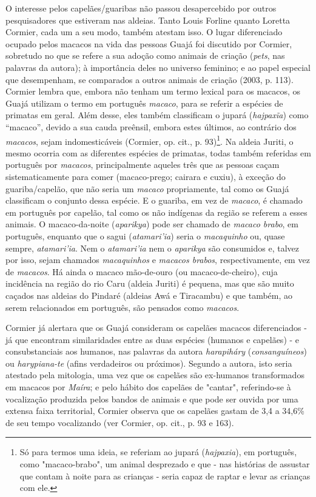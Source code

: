 O interesse pelos capelães/guaribas não passou desapercebido por outros
pesquisadores que estiveram nas aldeias. Tanto Louis Forline quanto
Loretta Cormier, cada um a seu modo, também atestam isso. O lugar
diferenciado ocupado pelos macacos na vida das pessoas Guajá foi
discutido por Cormier, sobretudo no que se refere a sua adoção como
animais de criação (\emph{pets}, nas palavras da autora); à importância
deles no universo feminino; e ao papel especial que desempenham, se
comparados a outros animais de criação (2003, p. 113). Cormier lembra
que, embora não tenham um termo lexical para os macacos, os Guajá
utilizam o termo em português \emph{macaco}, para se referir a espécies
de primatas em geral. Além desse, eles também classificam o jupará
(\emph{hajpaxĩa}) como ``macaco'', devido a sua cauda preênsil, embora
estes últimos, ao contrário dos \emph{macacos}, sejam indomesticáveis
(Cormier, op. cit., p. 93)\footnote{Só para termos uma ideia, se
  referiam ao jupará (\emph{hajpaxia}), em português, como
  "macaco-brabo", um animal desprezado e que - nas histórias de assustar
  que contam à noite para as crianças - seria capaz de raptar e levar as
  crianças com ele.}. Na aldeia Juriti, o mesmo ocorria com as
diferentes espécies de primatas, todas também referidas em português por
\emph{macacos}, principalmente aqueles três que as pessoas caçam
sistematicamente para comer (macaco-prego; cairara e cuxiu), à exceção
do guariba/capelão, que não seria um \emph{macaco} propriamente, tal
como os Guajá classificam o conjunto dessa espécie. E o guariba, em vez
de \emph{macaco}, é chamado em português por capelão, tal como os não
indígenas da região se referem a esses animais. O macaco-da-noite
(\emph{aparikya}) pode ser chamado de \emph{macaco brabo}, em português,
enquanto que o sagui (\emph{atamari'ia}) seria o \emph{macaquinho} ou,
quase sempre, \emph{atamari'ia}. Nem o \emph{atamari'ia} nem o
\emph{aparikya} são consumidos e, talvez por isso, sejam chamados
\emph{macaquinhos} e \emph{macacos brabos}, respectivamente, em vez de
\emph{macacos}. Há ainda o macaco mão-de-ouro (ou macaco-de-cheiro),
cuja incidência na região do rio Caru (aldeia Juriti) é pequena, mas que
são muito caçados nas aldeias do Pindaré (aldeias Awá e Tiracambu) e que
também, ao serem relacionados em português, são pensados como
\emph{macacos}.

Cormier já alertara que os Guajá consideram os capelães macacos
diferenciados - já que encontram similaridades entre as duas espécies
(humanos e capelães) - e consubstanciais aos humanos, nas palavras da
autora \emph{harapiháry} (\emph{consanguíneos}) ou \emph{harypiana-te}
(afins verdadeiros ou próximos). Segundo a autora, isto seria atestado
pela mitologia, uma vez que os capelães são ex-humanos transformados em
macacos por \emph{Maíra}; e pelo hábito dos capelães de "cantar",
referindo-se à vocalização produzida pelos bandos de animais e que pode
ser ouvida por uma extensa faixa territorial, Cormier observa que os
capelães gastam de 3,4 a 34,6\% de seu tempo vocalizando (ver Cormier,
op. cit., p. 93 e 163).

